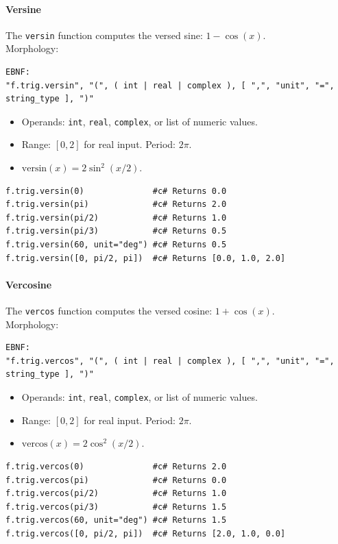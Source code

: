 \paragraph{Versine}
The \texttt{versin} function computes the versed sine: $1 - \cos(x)$.\\
Morphology:
\begin{verbatim}
EBNF:
"f.trig.versin", "(", ( int | real | complex ), [ ",", "unit", "=", string_type ], ")"
\end{verbatim}
\begin{itemize}
\item Operands: \texttt{int}, \texttt{real}, \texttt{complex}, or list of numeric values.
\item Range: $[0, 2]$ for real input. Period: $2\pi$.
\item $\text{versin}(x) = 2\sin^2(x/2)$.
\end{itemize}
\begin{verbatim}
f.trig.versin(0)              #c# Returns 0.0
f.trig.versin(pi)             #c# Returns 2.0
f.trig.versin(pi/2)           #c# Returns 1.0
f.trig.versin(pi/3)           #c# Returns 0.5
f.trig.versin(60, unit="deg") #c# Returns 0.5
f.trig.versin([0, pi/2, pi])  #c# Returns [0.0, 1.0, 2.0]
\end{verbatim}

\paragraph{Vercosine}
The \texttt{vercos} function computes the versed cosine: $1 + \cos(x)$.\\
Morphology:
\begin{verbatim}
EBNF:
"f.trig.vercos", "(", ( int | real | complex ), [ ",", "unit", "=", string_type ], ")"
\end{verbatim}
\begin{itemize}
\item Operands: \texttt{int}, \texttt{real}, \texttt{complex}, or list of numeric values.
\item Range: $[0, 2]$ for real input. Period: $2\pi$.
\item $\text{vercos}(x) = 2\cos^2(x/2)$.
\end{itemize}
\begin{verbatim}
f.trig.vercos(0)              #c# Returns 2.0
f.trig.vercos(pi)             #c# Returns 0.0
f.trig.vercos(pi/2)           #c# Returns 1.0
f.trig.vercos(pi/3)           #c# Returns 1.5
f.trig.vercos(60, unit="deg") #c# Returns 1.5
f.trig.vercos([0, pi/2, pi])  #c# Returns [2.0, 1.0, 0.0]
\end{verbatim}


